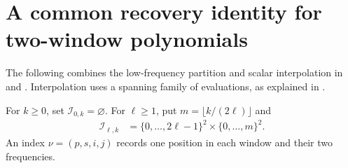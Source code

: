 \section{A common recovery identity for two-window polynomials}

The following combines the low-frequency partition and scalar interpolation
in \cite[Lemma~4.2]{Arad2013AreaLaw} and
\cite[Proposition~5.7]{Arad2016RigorousRG}.
Interpolation uses a spanning family of evaluations, as explained in
\cite{gap:aklv13_interpolation_and_word_count}.

\begin{definition}
    \label{def:crossing_frequency_index}
    \leanok
    For $k\ge0$, set $\mathcal I_{0,k}=\varnothing$. For $\ell\ge1$, put
    $m=\lfloor k/(2\ell)\rfloor$ and
    \begin{align}
        \mathcal I_{\ell,k}
         & =\{0,\ldots,2\ell-1\}^2\times\{0,\ldots,m\}^2.
        \label{eq:crossing_frequency_index}
    \end{align}
    An index $\nu=(p,s,i,j)$ records one position in each window and their two
    frequencies.
\end{definition}

